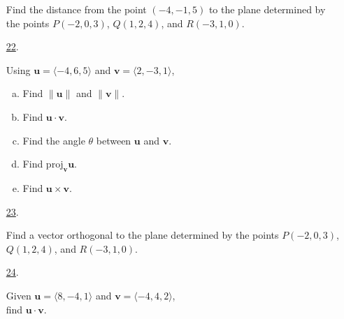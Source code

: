 \documentclass[fleqn]{article}
\renewcommand{\vec}[1]{\mathbf{#1}}
\begin{document}
\begin{itemize}
Find the distance from the point $(-4,-1,5)$ to the plane determined by the
points $P(-2,0,3)$, $Q(1,2,4)$, and $R(-3,1,0)$.
\smallskip

\item[\hyperlink{22-answer}{22}.]\hypertarget{22-problem}{}

Using \(\vec u=\langle-4,6,5\rangle\) and \(\vec v=\langle 2,-3,1\rangle\),
\begin{enumerate}[a.]
  \item Find \(\|\vec u\|\) and \(\|\vec v\|\).
  \item Find \(\vec u\cdot\vec v\).
  \item Find the angle \(\theta\) between \(\vec u\) and \(\vec v\).
  \item Find \(\text{proj}_{\vec v}\vec u\).
  \item Find \(\vec u\times\vec v\).
\end{enumerate}
\smallskip

\item[\hyperlink{23-answer}{23}.]\hypertarget{23-problem}{}

Find a vector orthogonal to the plane determined by the points
$P(-2,0,3)$, $Q(1,2,4)$, and $R(-3,1,0)$.
\smallskip

\item[\hyperlink{24-answer}{24}.]\hypertarget{24-problem}{}

Given $\vec u=\langle 8,-4,1\rangle$ and $\vec v=\langle -4,4,2\rangle$,\\
find $\vec u\cdot\vec v$.
\smallskip
\end{itemize}
\newpage
\end{document}
